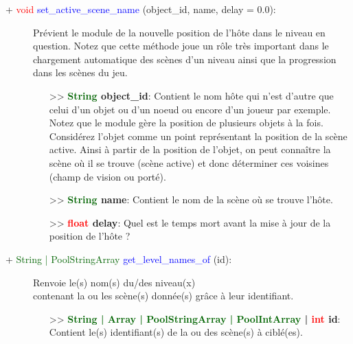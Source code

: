 \documentclass[a4paper, 11pt]{article}
\begin{document}
	\begin{description}
		\item [+ \textcolor{red}{void} \textcolor{blue}{\hypertarget{activescene}{set\_active\_scene\_name}} 
		(object\_id, name, delay = 0.0):] Prévient le module de la nouvelle position de l'hôte dans le 
		niveau en question. Notez que cette méthode joue un rôle très important dans le chargement 
		automatique des scènes d'un niveau ainsi que la progression dans les scènes du jeu.
		\begin{itemize}
			\item [>> \textbf{\textcolor{darkgreen}{String} object\_id}:] Contient le nom hôte qui n'est
			d'autre que celui d'un objet ou d'un noeud ou encore d'un joueur par exemple. Notez que le 
			module gère la position de plusieurs objets à la fois. Considérez l'objet comme un point 
			représentant la position de la scène active. Ainsi à partir de la position de l'objet, on peut 
			connaître la scène où il se trouve (scène active) et donc déterminer ces voisines (champ de 
			vision ou porté).
			\item [>> \textbf{\textcolor{darkgreen}{String} name}:] Contient le nom de la scène où se trouve
			l'hôte.
			\item [>> \textbf{\textcolor{red}{float} delay}:] Quel est le temps mort avant la mise à jour de
			la position de l'hôte ?\\
		\end{itemize}
	\end{description}
	\newpage \begin{description}
		\item [+ \textcolor{darkgreen}{String | PoolStringArray} \textcolor{blue}{get\_level\_names\_of} 
		(id):] Renvoie le(s) nom(s) du/des niveau(x) \\contenant la ou les scène(s) donnée(s) grâce à leur
		identifiant.
		\begin{itemize}
			\item [>> \textbf{\textcolor{darkgreen}{String | Array | PoolStringArray | PoolIntArray} |
			\textcolor{red}{int} id}:] Contient le(s) identifiant(s) de la ou des scène(s) à ciblé(es).\\
		\end{itemize}
	\end{description}
\end{document}
